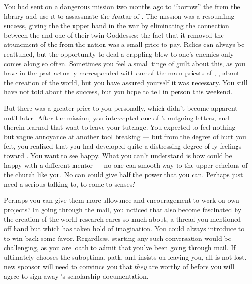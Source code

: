 \documentclass[char]{GL2020}
\begin{document}
You had sent \cScholarship{} on a dangerous mission two months ago to ``borrow'' the \iScythe{} from the \pSc{} library and use it to assassinate the Avatar of \cEbbFull{\full}. The mission was a resounding success, giving the \pTech{} the upper hand in the war by eliminating the connection between the \pShip{} and one of their twin Goddesses; the fact that it removed the attunement of the \iScythe{} from the \pFarm{} nation was a small price to pay. Relics can always be reattuned, but the opportunity to deal a crippling blow to one's enemies only comes along so often. Sometimes you feel a small tinge of guilt about this, as you have in the past actually corresponded with one of the main priests of \cEbb{}, \cEbbPriest{\full}, about the creation of the world, but you have assured yourself it was necessary. You still have not told \cEvil{} about the success, but you hope to tell \cEvil{\them} in person this weekend.  

But there was a greater price to you personally, which didn't become apparent until later. After the mission, you intercepted one of \cScholarship{}'s outgoing letters, and therein learned that \cScholarship{\they} want\cScholarship{\verbs} to leave your tutelage. You expected to feel nothing but vague annoyance at another tool breaking — but from the degree of hurt you felt, you realized that you had developed quite a distressing degree of \cAntiChup{\parent}ly feelings toward \cScholarship{\them}. You want to see \cScholarship{} happy. What you can’t understand is how \cScholarship{\they} could be happy with a different mentor — no one can smooth \cScholarship{\their} way to the upper echelons of the church like you. No can could give \cScholarship{\them} half the power that you can. Perhaps \cScholarship{\they} just need\cScholarship{\verbs} a serious talking to, to come to \cScholarship{\their} senses?  

Perhaps you can give them more allowance and encouragement to work on \cScholarship{\their} own projects? In going through the mail, you noticed that \cScholarship{\they} also \cScholarship{\have} become fascinated by the creation of the world research \cEbbPriest{} cares so much about, a thread you mentioned off hand but which has taken hold of \cScholarship{\their} imagination. You could always introduce \cScholarship{\them} to \cEbbPriest{} to win back some favor. Regardless, starting any such conversation would be challenging, as you are loath to admit that you've been going through \cScholarship{\their} mail.  If ultimately \cScholarship{} chooses the suboptimal path, and insists on leaving you, all is not lost. \cScholarship{\Their} new sponsor will need to convince you that \emph{they} are worthy of \cScholarship{} before you will agree to sign away \cScholarship{}'s scholarship documentation.
\end{document}
